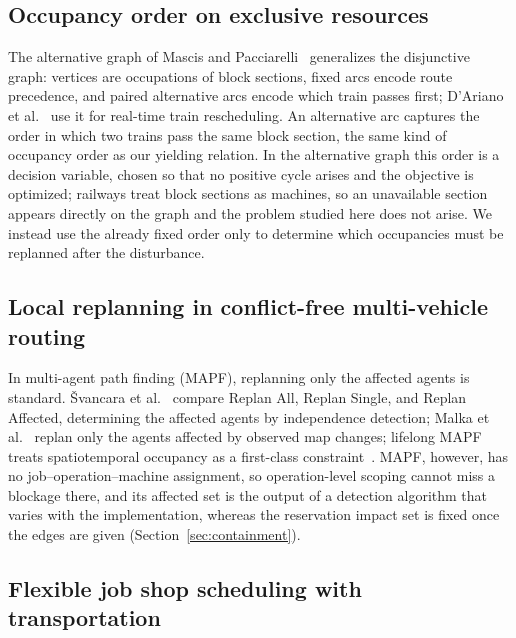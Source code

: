\documentclass[manuscript,screen,review]{acmart}
\begin{document}
\subsection{Occupancy order on exclusive resources}
\label{sec:rw_ag}

The alternative graph of Mascis and Pacciarelli~\cite{mascis2002alternative} generalizes the disjunctive graph: vertices are occupations of block sections,
fixed arcs encode route precedence, and paired alternative arcs encode which train passes first; D'Ariano et al.~\cite{dariano2007branch} use it for real-time train rescheduling.
An alternative arc captures the order in which two trains pass the same block section, the same kind of occupancy order as our yielding relation.
In the alternative graph this order is a decision variable, chosen so that no positive cycle arises and the objective is optimized;
railways treat block sections as machines, so an unavailable section appears directly on the graph and the problem studied here does not arise.
We instead use the already fixed order only to determine which occupancies must be replanned after the disturbance.

\subsection{Local replanning in conflict-free multi-vehicle routing}
\label{sec:rw_mapf}

In multi-agent path finding (MAPF), replanning only the affected agents is standard.
\v{S}vancara et al.~\cite{svancara2019online} compare Replan All, Replan Single, and Replan Affected, determining the affected agents by independence detection;
Malka et al.~\cite{malka2024online} replan only the agents affected by observed map changes; lifelong MAPF treats spatiotemporal occupancy as a first-class constraint~\cite{zhang2024guidance}.
MAPF, however, has no job--operation--machine assignment, so operation-level scoping cannot miss a blockage there,
and its affected set is the output of a detection algorithm that varies with the implementation, whereas the reservation impact set is fixed once the edges are given (Section~\ref{sec:containment}).

\subsection{Flexible job shop scheduling with transportation}
\label{sec:rw_position}
\end{document}
